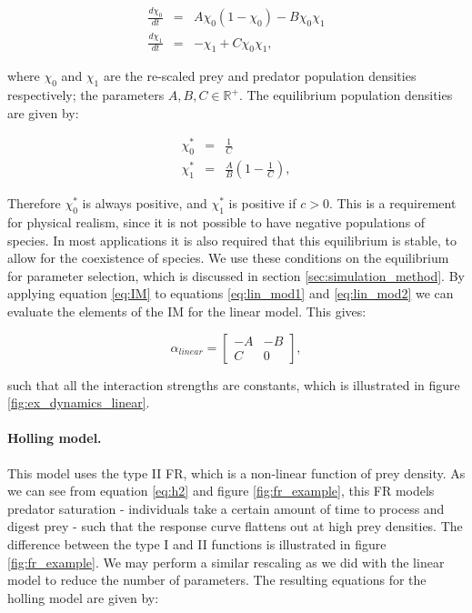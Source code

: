 \begin{eqnarray}
\frac{d\chi_{0}}{dt} &=& A\chi_0(1-\chi_0) - B\chi_0\chi_1 \label{eq:lin_mod1} \\
\frac{d\chi_{1}}{dt} &=& -\chi_1 + C\chi_0\chi_1 \label{eq:lin_mod2}, 
\end{eqnarray}

where $\chi_0$ and $\chi_1$ are the re-scaled prey and predator population densities respectively; the parameters $A,B,C \in \mathbb{R}^+$. The equilibrium population densities are given by:

\begin{eqnarray}
\chi_{0}^{*} &=& \frac{1}{C} \label{eq:lin_mod_sp1} \\
\chi_{1}^{*} &=& \frac{A}{B}\left(1 - \frac{1}{C}\right) \label{eq:lin_mod_sp2}, 
\end{eqnarray}

Therefore $\chi_{0}^{*}$ is always positive, and $\chi_{1}^{*}$ is positive if $c > 0$. This is a requirement for physical realism, since it is not possible to have negative populations of species. In most applications it is also required that this equilibrium is stable, to allow for the coexistence of species. We use these conditions on the equilibrium for parameter selection, which is discussed in section \ref{sec:simulation_method}. By applying equation \ref{eq:IM} to equations \ref{eq:lin_mod1} and \ref{eq:lin_mod2} we can evaluate the elements of the IM for the linear model. This gives:

\begin{equation}
\alpha_{linear} = 
\begin{bmatrix}
-A & -B \\ C & 0
\end{bmatrix}  	,
\end{equation}

such that all the interaction strengths are constants, which is illustrated in figure \ref{fig:ex_dynamics_linear}.

\paragraph*{Holling model.} 
This model uses the type II FR, which is a non-linear function of prey density. As we can see from equation \ref{eq:h2} and figure \ref{fig:fr_example}, this FR models predator saturation - individuals take a certain amount of time to process and digest prey - such that the response curve flattens out at high prey densities. The difference between the type I and II functions is illustrated in figure \ref{fig:fr_example}. We may perform a similar rescaling as we did with the linear model to reduce the number of parameters. The resulting equations for the holling model are given by:

